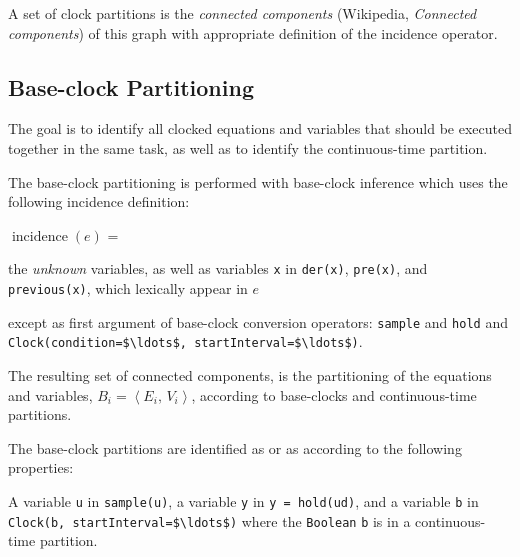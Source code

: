A set of clock partitions is the \emph{connected components} (Wikipedia,
\emph{Connected components}) of this graph with appropriate definition of
the incidence operator.

\subsection{Base-clock Partitioning}\label{base-clock-partitioning}

The goal is to identify all clocked equations and variables that should
be executed together in the same task, as well as to identify the
continuous-time partition.

The base-clock partitioning is performed with base-clock inference which
uses the following incidence definition:

$\operatorname{incidence}(e)$ =
\begin{list}{}{\setlength{\leftmargin}{2em}\setlength{\topsep}{-\parskip}}
\item
the \emph{unknown} variables, as well as variables \lstinline!x! in \lstinline!der(x)!, \lstinline!pre(x)!, and \lstinline!previous(x)!, which lexically appear in $e$
\begin{list}{}{\setlength{\leftmargin}{2em}\setlength{\topsep}{-\parskip}}
\item
except as first argument of base-clock conversion operators: \lstinline!sample! and \lstinline!hold! and \lstinline!Clock(condition=$\ldots$, startInterval=$\ldots$)!.
\end{list}
\end{list}\vspace{\parskip}%

The resulting set of connected components, is the partitioning of the equations and variables, $B_{i} = \left\langle E_{i},\, V_{i} \right\rangle$, according to base-clocks and continuous-time partitions.

The base-clock partitions are identified as  or as  according to the following properties:

A variable \lstinline!u! in \lstinline!sample(u)!, a variable \lstinline!y! in \lstinline!y = hold(ud)!, and a variable \lstinline!b! in \lstinline!Clock(b, startInterval=$\ldots$)! where the \lstinline!Boolean! \lstinline!b! is in a continuous-time partition.

